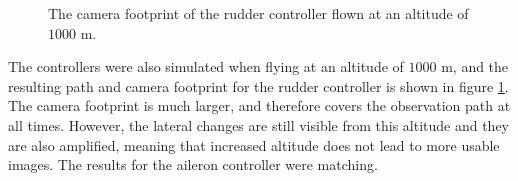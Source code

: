 \begin{figure}[]
    \centering
    \caption{The camera footprint of the rudder controller flown at an altitude of $1000$ m.}
	\label{fig:ratc_thousand}
\end{figure}

The controllers were also simulated when flying at an altitude of $1000$ m, and the resulting path and camera footprint for the rudder controller is shown in figure \ref{fig:ratc_thousand}. The camera footprint is much larger, and therefore covers the observation path at all times. However, the lateral changes are still visible from this altitude and they are also amplified, meaning that increased altitude does not lead to more usable images. The results for the aileron controller were matching.